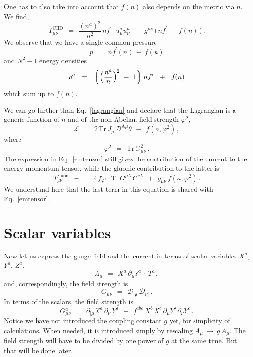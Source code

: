 \documentclass[epsfig,12pt]{article}
\def\beq{\begin{equation}}
\def\eeq{\end{equation}}
\newcommand{\p}{\partial}
\newcommand{\md}{\mathcal{D}}
\newcommand{\ml}{\mathcal{L}}
\newcommand{\lgr}{\left\lgroup}
\newcommand{\rgr}{\right\rgroup}
\newcommand{\Tr}{\text{Tr}}
\begin{document}
	One has to also take into account that $ f(n) $ also depends on the metric via $ n $.
	We find,
\beq
\label{emtensor}
	T_{\mu\nu}^\text{CHD}    ~~=~~    \frac{(n^a)^2}{n^2}\, n f^\prime \cdot u_\mu^a u_\nu^a  ~~-~~
					  g^{\mu\nu}\, \big(\, n f^\prime ~-~ f(n) \,\big)\,.
\eeq
	We observe that we have a single common pressure
\beq
	p    ~~=~~    n f^\prime(n) ~-~ f(n)
\eeq
	and $ N^2 - 1 $ energy densities
\beq
	\rho^a    ~~=~~    \lgr \Big( \frac{n^a}{n} \Big)^2 ~-~ 1 \rgr n f^\prime  ~~+~~ f(n)
\eeq
	which sum up to $ f(n) $.

        We can go further than Eq.~\eqref{lagrangian} and declare that the Lagrangian
        is a generic function of $ n $ and of the non-Abelian field strength $ \varphi^2 $,
\beq
\label{generic}
        \ml    ~~=~~    2\, \Tr\, J_\mu\,  \md^{\text{A}\mu} \theta   ~~-~~  f(n, \varphi^2)\,,
\eeq
        where
\beq
        \varphi^2    ~~=~~    \Tr\, G_{\mu\nu}^2\,.
\eeq
	The expression in Eq.~\eqref{emtensor} still gives the contribution of the current to the energy-momentum tensor,
	while the gluonic contribution to the latter is
\beq
\label{T-gluon}
	T_{\mu\nu}^\text{gluon}    ~~=~~    -\, 4\, f^\prime_{\varphi^2} \cdot \Tr\, G^{\mu\lambda}\, G^{\nu\lambda}
				   ~~+~~    g_{\mu\nu}\, f(n, \varphi^2)\,.
\eeq
	We understand here that the last term in this equation is shared with Eq.~\eqref{emtensor}.




\section{Scalar variables}

	Now let us express the gauge field and the current in terms of scalar variables $ X^a $, $ Y^a $, $ Z^a $.
\beq
\label{defA}
        A_\mu    ~~=~~    X^a\, \p_\mu Y^a\, \cdot\, T^a\,,
\eeq
	and, correspondingly, the field strength is
\beq
\label{defG}
	G_{\mu\nu}    ~~=~~    \md_{[\mu}\, \md_{\nu]}\,.
\eeq
	In terms of the scalars, the field strength is
\beq
\label{Ga}
	G{}_{\mu\nu}^a    ~~=~~    \p_{[\mu} X^a\, \p_{\nu]} Y^a  ~~+~~
				   f^{abc}\, X^b\, X^c\, \p_\mu Y^b\, \p_\nu Y^c\,.
\eeq
        Notice we have not introduced the coupling constant $ g $ yet, for simplicity of calculations.
	When needed, it is introduced simply by rescaling $ A_\mu ~\to~ g\, A_\mu $.
	The field strength will have to be divided by one power of $ g $ at the same time.
	But that will be done later.
\end{document}
